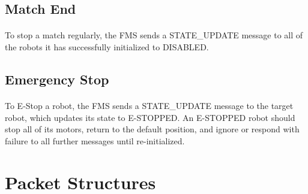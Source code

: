 \documentclass[11pt]{article}
\begin{document}
\subsection {Match End}
\paragraph{}
To stop a match regularly, the FMS sends a STATE\_UPDATE message to 
all of the robots it has successfully initialized to DISABLED.

\subsection{Emergency Stop}
\paragraph{}
To E-Stop a robot, the FMS sends a STATE\_UPDATE message to the target robot, which updates its state to E-STOPPED.
An E-STOPPED robot should stop all of its motors,
return to the default position, and ignore or respond with failure to all further messages until re-initialized.

\section {Packet Structures}

\end{document}
